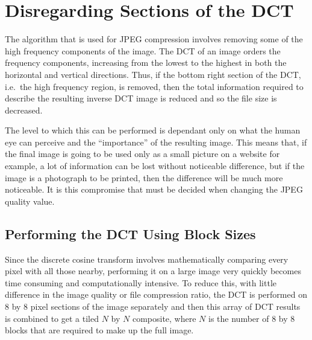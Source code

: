 \section{Disregarding Sections of the DCT} %
	\label{sec:disregarding_sections_of_the_dct}
	The algorithm that is used for JPEG compression involves removing some of the high frequency components of the image. The DCT of an image orders the frequency components, increasing from the lowest to the highest in both the horizontal and vertical directions. Thus, if the bottom right section of the DCT, i.e.\ the high frequency region, is removed, then the total information required to describe the resulting inverse DCT image is reduced and so the file size is decreased.

	The level to which this can be performed is dependant only on what the human eye can perceive and the ``importance'' of the resulting image. This means that, if the final image is going to be used only as a small picture on a website for example, a lot of information can be lost without noticeable difference, but if the image is a photograph to be printed, then the difference will be much more noticeable. It is this compromise that must be decided when changing the JPEG quality value.

	\subsection{Performing the DCT Using Block Sizes} %
		\label{sub:performing_the_dct_using_block_sizes}
		Since the discrete cosine transform involves mathematically comparing every pixel with all those nearby, performing it on a large image very quickly becomes time consuming and computationally intensive. To reduce this, with little difference in the image quality or file compression ratio, the DCT is performed on 8 by 8 pixel sections of the image separately and then this array of DCT results is combined to get a tiled $N$ by $N$ composite, where $N$ is the number of 8 by 8 blocks that are required to make up the full image.


